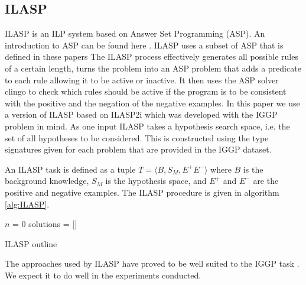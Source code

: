 \subsection{ILASP}

ILASP is an ILP system based on Answer Set Programming (ASP). An introduction to ASP can be found here \cite{Corapi/ASP}. ILASP uses a subset of ASP that is defined in these papers\cite{ILASP-Manuel}\cite{MarkLaw/OG-ILASP}\cite{MarkLaw/Thesis} The ILASP process effectively generates all possible rules of a certain length, turns the problem into an ASP problem that adds a predicate to each rule allowing it to be active or inactive. It then uses the ASP solver clingo\cite{Clingo}  to check which rules should be active if the program is to be consistent with the positive and the negation of the negative examples\cite{MarkLaw/OG-ILASP}\cite{MarkLaw/Thesis}. In this paper we use a version of ILASP based on ILASP2i\cite{MarkLaw/ILASP2i} which was developed with the IGGP problem in mind\cite{Cropper/IGGP}. As one input ILASP takes a hypothesis search space, i.e. the set of all hypotheses to be considered. This is constructed using the type signatures given for each problem that are provided in the IGGP dataset.

An ILASP task is defined as a tuple $T = \langle B,S_M,E^+E^-\rangle$ where $B$ is the background knowledge, $S_M$ is the hypothesis space, and $E^+$ and $E^-$ are the positive and negative examples. The ILASP procedure is given in algorithm \ref{alg:ILASP}. 
\begin{algorithm}[H]\label{alg:ILASP}
	\SetAlgoLined
	$n$ = 0\;
	solutions = []\;
	\caption{ILASP outline}
\end{algorithm}

The approaches used by ILASP have proved to be well suited to the IGGP task \cite{Cropper/IGGP}. We expect it to do well in the experiments conducted.